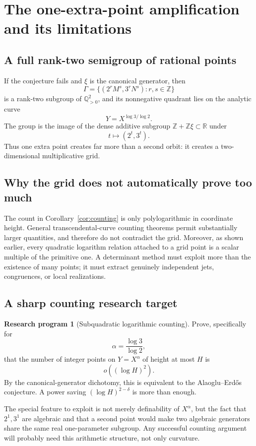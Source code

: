 \documentclass[11pt,oneside]{article}
\theoremstyle{definition}
\newtheorem{program}[theorem]{Research program}
\newcommand{\Z}{\mathbb Z}
\newcommand{\Q}{\mathbb Q}
\newcommand{\R}{\mathbb R}
\begin{document}
\section{The one-extra-point amplification and its limitations}

\subsection{A full rank-two semigroup of rational points}

If the conjecture fails and $\xi$ is the canonical generator, then
\[
 \Gamma=\{(2^rM^s,3^rN^s):r,s\in\Z\}
\]
is a rank-two subgroup of $\Q_{>0}^2$, and its nonnegative quadrant lies on the analytic curve
\[
  Y=X^{\log3/\log2}.
\]
The group is the image of the dense additive subgroup $\Z+\Z\xi\subset\R$ under
\[
  t\longmapsto(2^t,3^t).
\]
Thus one extra point creates far more than a second orbit: it creates a two-dimensional multiplicative grid.

\subsection{Why the grid does not automatically prove too much}

The count in Corollary~\ref{cor:counting} is only polylogarithmic in coordinate height.  General transcendental-curve counting theorems permit substantially larger quantities, and therefore do not contradict the grid.  Moreover, as shown earlier, every quadratic logarithm relation attached to a grid point is a scalar multiple of the primitive one.  A determinant method must exploit more than the existence of many points; it must extract genuinely independent jets, congruences, or local realizations.

\subsection{A sharp counting research target}

\begin{program}[Subquadratic logarithmic counting]
Prove, specifically for
\[
  \alpha=\frac{\log3}{\log2},
\]
that the number of integer points on $Y=X^\alpha$ of height at most $H$ is
\[
  o((\log H)^2).
\]
By the canonical-generator dichotomy, this is equivalent to the Alaoglu--Erd\H{o}s conjecture.  A power saving $(\log H)^{2-\delta}$ is more than enough.
\end{program}

The special feature to exploit is not merely definability of $X^\alpha$, but the fact that $2^1,3^1$ are algebraic and that a second point would make two algebraic generators share the same real one-parameter subgroup.  Any successful counting argument will probably need this arithmetic structure, not only curvature.
\end{document}
